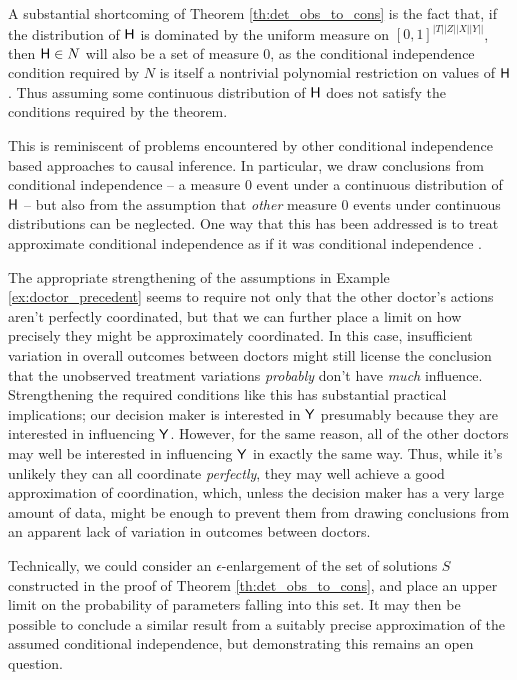 A substantial shortcoming of Theorem \ref{th:det_obs_to_cons} is the fact that, if the distribution of $\mathsf{H}$ is dominated by the uniform measure on $[0,1]^{|T||Z||X||Y||}$, then $\mathsf{H}\in N$ will also be a set of measure 0, as the conditional independence condition required by $N$ is itself a nontrivial polynomial restriction on values of $\mathsf{H}$. Thus assuming some continuous distribution of $\mathsf{H}$ does not satisfy the conditions required by the theorem.

This is reminiscent of problems encountered by other conditional independence based approaches to causal inference. In particular, we draw conclusions from conditional independence -- a measure 0 event under a continuous distribution of $\mathsf{H}$ -- but also from the assumption that \emph{other} measure 0 events under continuous distributions can be neglected. One way that this has been addressed is to treat approximate conditional independence as if it was conditional independence \citep{zhang_strong_2003}.

The appropriate strengthening of the assumptions in Example \ref{ex:doctor_precedent} seems to require not only that the other doctor's actions aren't perfectly coordinated, but that we can further place a limit on how precisely they might be approximately coordinated. In this case, insufficient variation in overall outcomes between doctors might still license the conclusion that the unobserved treatment variations \emph{probably} don't have \emph{much} influence. Strengthening the required conditions like this has substantial practical implications; our decision maker is interested in $\mathsf{Y}$ presumably because they are interested in influencing $\mathsf{Y}$. However, for the same reason, all of the other doctors may well be interested in influencing $\mathsf{Y}$ in exactly the same way. Thus, while it's unlikely they can all coordinate \emph{perfectly}, they may well achieve a good approximation of coordination, which, unless the decision maker has a very large amount of data, might be enough to prevent them from drawing conclusions from an apparent lack of variation in outcomes between doctors.

Technically, we could consider an $\epsilon$-enlargement of the set of solutions $S$ constructed in the proof of Theorem \ref{th:det_obs_to_cons}, and place an upper limit on the probability of parameters falling into this set. It may then be possible to conclude a similar result from a suitably precise approximation of the assumed conditional independence, but demonstrating this remains an open question.

